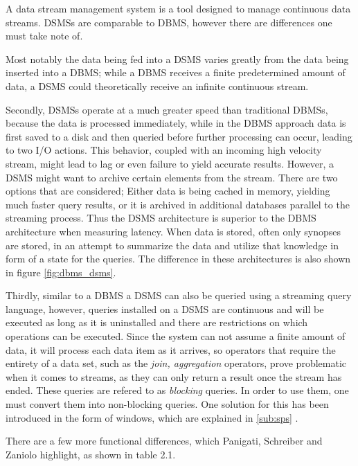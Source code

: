         A data stream management system is a tool designed to manage continuous data streams.
        DSMSs are comparable to DBMS, however there are differences one must take note of.

        Most notably the data being fed into a DSMS varies greatly from the data being inserted into a DBMS; while a DBMS receives a finite predetermined amount 
        of data, a DSMS could theoretically receive an infinite continuous stream.

        Secondly, DSMSs operate at a much greater speed than traditional DBMSs, because the data is processed immediately, while in the DBMS approach
        data is first saved to a disk and then queried before further processing can occur, leading to two I/O actions. This behavior, coupled with an incoming 
        high velocity stream, might lead to lag or even failure to yield accurate results\cite{StreamBookQuality}. 
        However, a DSMS might want to archive certain elements from the stream. There are two options that are considered;
        Either data is being cached in memory, yielding much faster query results, or it is archived in additional databases parallel to the streaming process.
        Thus the DSMS architecture is superior to the DBMS architecture when measuring latency.
        When data is stored, often only synopses are stored, in an attempt to summarize the data and utilize that knowledge in form of a state for the queries.
        The difference in these architectures is also shown in figure \ref{fig:dbms_dsms}\cite{StreamBookQuality}.

        Thirdly, similar to a DBMS a DSMS can also be queried using a streaming query language, however, queries installed on a DSMS are continuous 
        and will be executed as long as it is uninstalled and there are restrictions on which operations can be executed.
        Since the system can not assume a finite amount of data, it will process each data item as it arrives, so operators that require the entirety of a data 
        set, such as the \textit{join, aggregation} operators, prove problematic when it comes to streams, as they can only return a result once the stream has ended\cite[p.12]{StreamBookQuality}.
        These queries are refered to as \textit{blocking} queries. In order to use them, one must convert them into non-blocking queries.
        One solution for this has been introduced in the form of windows, which are explained in \ref{sub:sps} .

        There are a few more functional differences, which Panigati, Schreiber and Zaniolo highlight, as shown in table 2.1.

